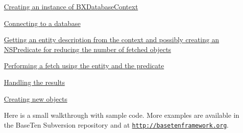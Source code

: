 \begin{DoxyItemize}
\item \hyperlink{getting_started_creating_a_database_context}{Creating an instance of B\+X\+Database\+Context} 
\item \hyperlink{getting_started_connecting_to_a_database}{Connecting to a database} 
\item \hyperlink{getting_started_getting_an_entity_and_a_predicate}{Getting an entity description from the context and possibly creating an N\+S\+Predicate for reducing the number of fetched objects} 
\item \hyperlink{getting_started_performing_a_fetch}{Performing a fetch using the entity and the predicate} 
\item \hyperlink{getting_started_handling_the_results}{Handling the results} 
\item \hyperlink{getting_started_creating_objects}{Creating new objects} 
\end{DoxyItemize}Here is a small walkthrough with sample code. More examples are available in the Base\+Ten Subversion repository and at \href{http://basetenframework.org}{\tt http\+://basetenframework.\+org}.

